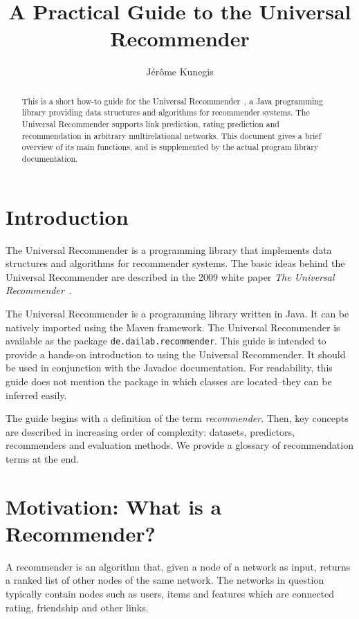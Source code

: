 \documentclass{article}
\begin{document}
\title{A Practical Guide to the Universal Recommender}

\author{ Jérôme Kunegis }

\maketitle

\begin{abstract}
This is a short how-to guide for the Universal
Recommender~\cite{kunegis:universal-recommender}, a Java programming
library providing data structures and algorithms for recommender
systems. 
The Universal Recommender supports link prediction, rating prediction
and recommendation in arbitrary multirelational networks. 
This document gives a brief overview of its main functions, and is
supplemented by the actual program library documentation. 
\end{abstract}

\section{Introduction}
The Universal Recommender is a programming library that implements data
structures and algorithms for recommender systems.  The basic ideas
behind the Universal Recommender are described in the 2009 white paper
\emph{The Universal Recommender}~\cite{kunegis:universal-recommender}.

The Universal Recommender is a programming library written in Java.  It
can be natively imported using the Maven framework.  The Universal
Recommender is available as the package \texttt{de.dailab.recommender}.
This guide is intended to provide a hands-on introduction to using the
Universal Recommender.  It should be used in conjunction with the
Javadoc documentation.  For readability, this guide does not mention the
package in which classes are located--they can be inferred easily. 

The guide begins with a definition of the term \emph{recommender}.
Then, key concepts are described in increasing order of complexity:
datasets, predictors, recommenders and evaluation methods.  
We provide a glossary of recommendation terms at the end.

\section{Motivation:  What is a Recommender?}
A recommender is an algorithm that, given a node of a network as input,
returns a ranked list of other nodes of the same network.  The networks
in question typically contain nodes such as users, items and features
which are connected rating, friendship and other links.  
\end{document}
